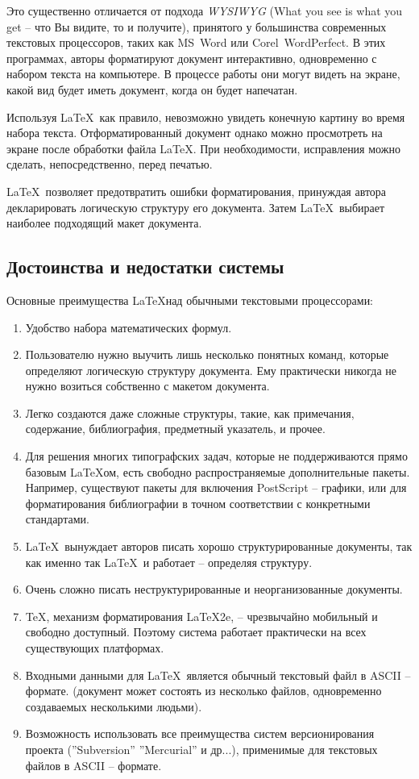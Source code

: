 Это существенно отличается от подхода \textit{WYSIWYG} (What you see is what you get – что Вы видите, то и получите), принятого у большинства современных текстовых процессоров, таких как MS~Word или Corel~WordPerfect. В этих программах, авторы форматируют документ интерактивно, одновременно с набором текста на компьютере. В процессе работы они могут видеть на экране, какой вид будет иметь документ, когда он будет напечатан.

\SetEmptyPage
Используя \LaTeX\, как правило, невозможно увидеть конечную картину во время набора текста. Отформатированный документ однако можно просмотреть на экране после обработки файла \LaTeX. При необходимости, исправления можно сделать, непосредственно, перед печатью.

\LaTeX\ позволяет предотвратить ошибки форматирования, принуждая автора декларировать логическую структуру его документа. Затем \LaTeX\ выбирает наиболее подходящий макет документа.



\subsection{Достоинства и недостатки системы}

Основные преимущества \LaTeX над обычными текстовыми процессорами:
\begin{enumerate}
  \item Удобство набора математических формул.
  \item Пользователю нужно выучить лишь несколько понятных команд, которые определяют логическую структуру документа. Ему практически никогда не нужно возиться собственно с макетом документа.
  \item Легко создаются даже сложные структуры, такие, как примечания, содержание, библиография, предметный указатель, и прочее.
  \item Для решения многих типографских задач, которые не поддерживаются прямо базовым \LaTeX ом, есть свободно распространяемые дополнительные пакеты. Например, существуют пакеты для включения PostScript – графики, или для форматирования библиографии в точном соответствии с конкретными стандартами. 
  \item \LaTeX\ вынуждает авторов писать хорошо структурированные документы, так как именно так \LaTeX\ и работает – определяя структуру. 
  \item Очень сложно писать неструктурированные и неорганизованные документы.
  \item \TeX, механизм форматирования \LaTeX2e, – чрезвычайно мобильный и свободно доступный. Поэтому система работает практически на всех существующих платформах.
  \item Входными данными для \LaTeX\ является обычный текстовый файл в ASCII – формате. (документ может состоять из несколько файлов, одновременно создаваемых несколькими людьми).  
  \item Возможность использовать все преимущества систем версионирования проекта (''Subversion'' ''Mercurial'' и др...), применимые для текстовых файлов в ASCII – формате.
\end{enumerate}


